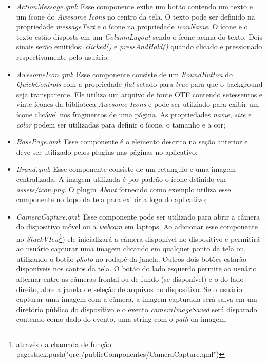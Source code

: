 \begin{itemize}
	\item \textit{ActionMessage.qml}: Esse componente exibe um botão contendo um texto e um ícone do \textit{Awesome Icons} no centro da tela. O texto pode ser definido na propriedade \textit{messageText} e o ícone na propriedade \textit{iconName}. O ícone e o texto estão disposts em um \textit{ColumnLayout} sendo o ícone acima do texto. Dois sinais serão emitidos: \textit{clicked()} e \textit{pressAndHold()} quando clicado e pressionado respectivamente pelo usuário;

	\item \textit{AwesomeIcon.qml}: Esse componente consiste de um \textit{RoundButton} do \textit{QuickControls} com a propriedade \textit{flat} setado para \textit{true} para que o background seja transparente. Ele utiliza um arquivo de fonte OTF contendo setessentos e vinte ícones da biblioteca \textit{Awesome Icons} e pode ser utilziado para exibir um ícone clicável nos fragmentos de uma página. As propriedades \textit{name}, \textit{size} e \textit{color} podem ser utilizadas para definir o ícone, o tamanho e a cor;

	\item \textit{BasePage.qml}: Esse componente é o elemento descrito na seção anterior e deve ser utilizado pelos plugins nas páginas no aplicativo;

	\item \textit{Brand.qml}: Esse componente consiste de um retangulo e uma imagem centralizada. A imagem utilizada é por padrão o ícone definido em \textit{assets/icon.png}. O plugin \textit{About} fornecido como exemplo utiliza esse componente no topo da tela para exibir a logo do aplicativo;

	\item \textit{CameraCapture.qml}: Esse componente pode ser utilizado para abrir a câmera do dispositivo móvel ou a \textit{webcam} em laptops. Ao adicionar esse componente no \textit{StackVIew}\footnote{através da chamada de função pagestack.push("qrc:/publicComponentes/CameraCapture.qml")}) ele inicializará a câmera disponível no dispositivo e permitirá ao usuário capturar uma imagem clicando em qualquer ponto da tela ou, utilizando o botão \textit{photo} no rodapé da janela. Outros dois botões estarão disponíveis nos cantos da tela. O botão do lado esquerdo permite ao usuário alternar entre as câmeras frontal ou de fundo (se disponível) e o do lado direito, abre a janela de seleção de arquivos no dispositivo. Se o usuário capturar uma imagem com a câmera, a imagem capturada será salva em um diretório público do dispositivo e o evento \textit{cameraImageSaved} será disparado contendo como dado do evento, uma string com o \textit{path} da imagem;


\end{itemize}
